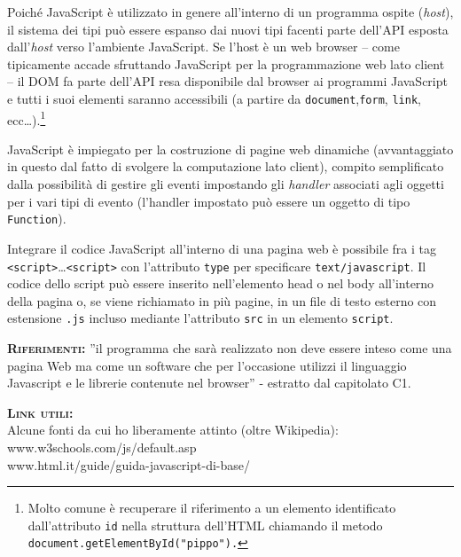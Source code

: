\begin{description}
  Poiché JavaScript è utilizzato in genere all'interno di un programma ospite (\textit{host}), il sistema dei tipi può essere espanso dai nuovi tipi facenti parte dell'API esposta dall'\textit{host} verso l'ambiente JavaScript. Se l'host è un web browser -- come tipicamente accade sfruttando JavaScript per la programmazione web lato client --  il DOM fa parte dell'API resa disponibile dal browser ai programmi JavaScript e tutti i suoi elementi saranno accessibili (a partire da \texttt{document},\texttt{form}, \texttt{link}, ecc\dots).\footnote{%
    Molto comune è recuperare il riferimento a un elemento identificato dall'attributo \texttt{id} nella struttura dell'HTML chiamando il metodo \texttt{document.getElementById("pippo").}
  }
  
  JavaScript è impiegato per la costruzione di pagine web dinamiche (avvantaggiato in questo dal fatto di svolgere la computazione lato client), compito semplificato dalla possibilità di gestire gli eventi impostando gli \textit{handler} associati agli oggetti per i vari tipi di evento (l'handler impostato può essere un oggetto di tipo \texttt{Function}).
  
  Integrare il codice JavaScript all'interno di una pagina web è possibile fra i tag \texttt{<script>}\dots\texttt{<script>} con l'attributo \texttt{type} per specificare \texttt{text/javascript}. Il codice dello script può essere inserito nell'elemento head o nel body all'interno della pagina o, se viene richiamato in più pagine, in un file di testo esterno con estensione \texttt{.js} incluso mediante l'attributo \texttt{src} in un elemento \texttt{script}.
  
	\item{\scshape\bfseries Riferimenti:}
  ''il programma che sarà realizzato non deve essere inteso come una pagina Web ma come un software che per l'occasione utilizzi il linguaggio Javascript e le librerie contenute nel browser'' - estratto dal capitolato C1.

	\item{\scshape\bfseries Link utili:}\\
  Alcune fonti da cui ho liberamente attinto (oltre Wikipedia):\\
  www.w3schools.com/js/default.asp\\
  www.html.it/guide/guida-javascript-di-base/
\end{description}

